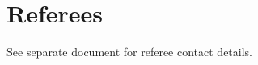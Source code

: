 \documentclass[letterpaper]{article}
\renewenvironment{itemize}{
  \begin{list}{}{
    \setlength{\leftmargin}{1.5em}
  }
}{
  \end{list}
}
\begin{document}

\section*{Referees}
See separate document for referee contact details.
%	
%	
\end{document}
